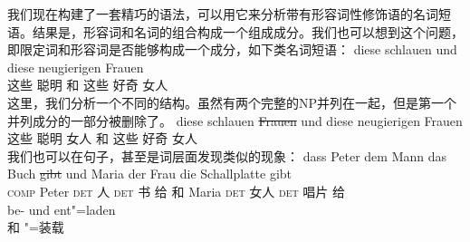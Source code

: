 我们现在构建了一套精巧的语法，可以用它来分析带有形容词性修饰语的名词短语。结果是，形容词和名词的组合构成一个组成成分。我们也可以想到这个问题，即限定词和形容词是否能够构成一个成分，如下类名词短语：
\ea
\gll diese schlauen und diese neugierigen Frauen\\
	 这些 聪明 和 这些 好奇 女人\\
\z
这里，我们分析一个不同的结构。虽然有两个完整的NP并列在一起，但是第一个并列成分的一部分被删除了。
\ea
\gll diese schlauen \st{Frauen} und diese neugierigen Frauen\\
	  这些 聪明 女人 和 这些 好奇 女人\\
\z
我们也可以在句子，甚至是词层面发现类似的现象：
\eal
\ex 
\gll dass Peter dem Mann das Buch \st{gibt} und Maria der Frau die Schallplatte gibt\\
     \textsc{comp} Peter \textsc{det} 人 \textsc{det} 书 给 和 Maria \textsc{det} 女人 \textsc{det} 唱片 给\\
\ex 
\gll be- und ent"=laden\\
	 \prt{} 和 \prt{}"=装载\\
\zl

